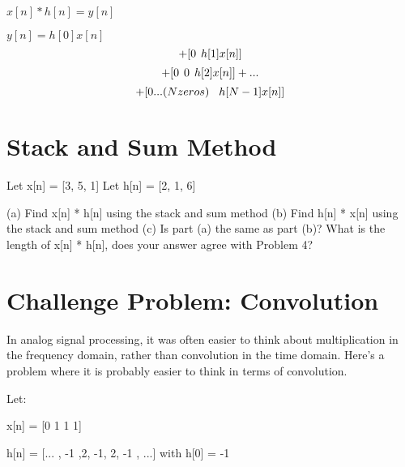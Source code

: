\documentclass[11pt]{article}
\begin{document}
\begin{center}

$
x[n] * h[n] = y[n]
$
\end{center}

\begin{center}

$
y[n] = h[0]x[n]
$
$$
+ [0 \hspace{1.5mm} h[1]x[n]]
$$
$$
+ [0 \hspace{1.5mm} 0 \hspace{1.5mm} h[2]x[n]] + ...
$$
$$
+ [0...(N zeros) \hspace{1.5mm}  \hspace{1.5mm} h[N-1]x[n]]
$$


\end{center}


\vspace{1.5mm}





\section{Stack and Sum Method}

Let x[n] = [3, 5, 1]\newline
Let h[n] = [2, 1, 6]\newline

\vspace{3mm}
(a) Find x[n] * h[n] using the stack and sum method\newline
(b) Find h[n] * x[n] using the stack and sum method\newline
(c) Is part (a) the same as part (b)? What is the length of x[n] * h[n], does your answer agree with Problem 4?


\newpage

\section{Challenge Problem: Convolution}

In analog signal processing, it was often easier to think about multiplication in the frequency domain, rather than convolution in the time domain. Here's a problem where it is probably easier to think in terms of convolution.

Let:


\begin{center}


x[n] = [0 1 1 1]

\end{center}
\begin{center}


h[n] = [... , -1 ,2, -1, 2, -1 , ...] with h[0] = -1

\end{center}
\end{document}
